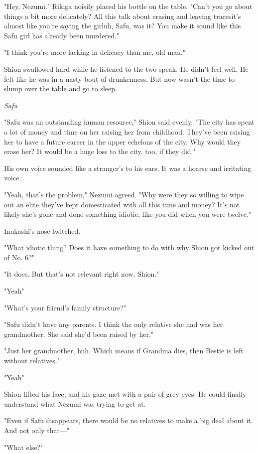 "Hey, Nezumi." Rikiga noisily placed his bottle on the table. "Can't you
go about things a bit more delicately? All this talk about erasing and
leaving traces\el it's almost like you're saying the girl\el uh, Safu,
was it? You make it sound like this Safu girl has already been
murdered."

"I think you're more lacking in delicacy than me, old man."

Shion swallowed hard while he listened to the two speak. He didn't feel
well. He felt like he was in a nasty bout of drunkenness. But now wasn't
the time to slump over the table and go to sleep.

\emph{Safu\el }

"Safu was an outstanding human resource," Shion said evenly. "The city
has spent a lot of money and time on her raising her from childhood.
They've been raising her to have a future career in the upper echelons
of the city. Why would they erase her? It would be a huge loss to the
city, too, if they did."

His own voice sounded like a stranger's to his ears. It was a hoarse and
irritating voice.

"Yeah, that's the problem," Nezumi agreed. "Why were they so willing to
wipe out an elite they've kept domesticated with all this time and
money? It's not likely she's gone and done something idiotic, like you
did when you were twelve."

Inukashi's nose twitched.

"What idiotic thing? Does it have something to do with why Shion got
kicked out of No. 6?"

"It does. But that's not relevant right now. Shion."

"Yeah\el "

"What's your friend's family structure?"

"Safu didn't have any parents. I think the only relative she had was her
grandmother. She said she'd been raised by her."

"Just her grandmother, huh. Which means if Grandma dies, then Bestie is
left without relatives."

"Yeah\el "

Shion lifted his face, and his gaze met with a pair of grey eyes. He
could finally understand what Nezumi was trying to get at.

"Even if Safu disappears, there would be no relatives to make a big deal
about it. And not only that---"

"What else?"

